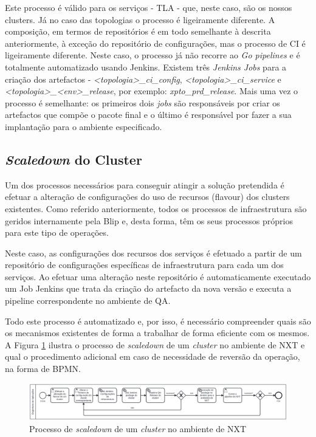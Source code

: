 Este processo é válido para os serviços - \ac{TLA} - que, neste caso, são os nossos \glspl{cluster}.
Já no caso das topologias o processo é ligeiramente diferente. A composição, em termos de 
repositórios é em todo semelhante à descrita anteriormente, à exceção do repositório de configurações,
mas o processo de \ac{CI} é ligeiramente diferente. Neste caso, o processo já não recorre ao 
\textit{Go pipelines} e é totalmente automatizado usando Jenkins. Existem três \textit{Jenkins Jobs} 
para a criação dos artefactos - \textit{<topologia>\_ci\_config}, \textit{<topologia>\_ci\_service}
e \textit{<topologia>\_<env>\_release}, por exemplo: \textit{xpto\_prd\_release}. Mais uma vez o 
processo é semelhante: os primeiros dois \textit{jobs} são responsáveis por criar os artefactos 
que compõe o pacote final e o último é responsável por fazer a sua implantação para o ambiente 
especificado.

\subsection{\textit{Scaledown} do Cluster}

Um dos processos necessários para conseguir atingir a solução pretendida é efetuar a alteração
de configurações do uso de recursos (\gls{flavour}) dos \glspl{cluster} existentes. Como
referido anteriormente, todos os processos de infraestrutura são geridos internamente pela Blip e,
desta forma, têm os seus processos próprios para este tipo de operações.

Neste caso, as configurações dos recursos dos serviços é efetuado a partir de um repositório 
de configurações específicas de infraestrutura para cada um dos serviços. Ao efetuar uma alteração
neste repositório é automaticamente executado um Job Jenkins que trata da criação do artefacto
da nova versão e executa a \gls{pipeline} correspondente no ambiente de \ac{QA}.

Todo este processo é automatizado e, por isso, é necessário compreender quais são os mecanismos
existentes de forma a trabalhar de forma eficiente com os mesmos. A Figura \ref{scaledown-nxt} 
ilustra o processo de \textit{scaledown} de um \textit{cluster} no ambiente de NXT e qual o 
procedimento adicional em caso de necessidade de reversão da operação, na forma de \ac{BPMN}.

\begin{figure}[H]
  \centerline{\includegraphics[scale=0.1]{media/content/impl/scaledown_nxt.png}}
  \caption{Processo de \textit{scaledown} de um \textit{cluster} no ambiente de NXT}
  \label{scaledown-nxt}
\end{figure}

